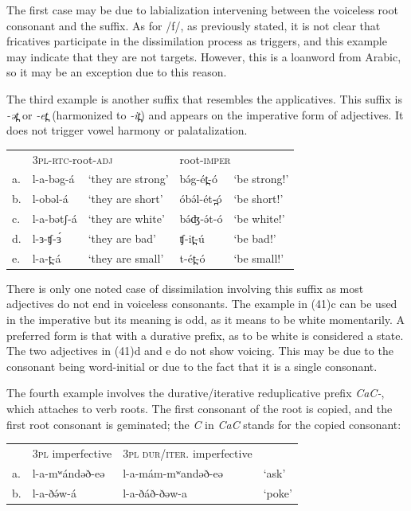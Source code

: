 The first case may be due to labialization intervening between the voiceless root consonant and the suffix. As for /f/, as previously stated, it is not clear that fricatives participate in the dissimilation process as triggers, and this example may indicate that they are not targets. However, this is a loanword from Arabic, so it may be an exception due to this reason. 

The third example is another suffix that resembles the applicatives. This suffix is \textit{-ət̪} or \textit{-et̪} (harmonized to \textit{-it̪}) and appears on the imperative form of adjectives. It does not trigger vowel harmony or palatalization. 

\ea
\begin{tabular}[t]{lllll}
&	\multicolumn{2}{l}{3\textsc{pl}-\textsc{rtc}-root-\textsc{adj}}	&	\multicolumn{2}{l}{root-\textsc{imper}}\\
a.&	l-a-bəg-á	& `they are strong' &	bə́g-ét̪-ó	&	‘be strong!’\\
b.&	l-obəl-á	& `they are short' &	óbə́l-ét-̪ó	&	‘be short!’\\
c.& l-a-bətʃ-á	& `they are white' &	bə́ʤ-ə́t-ó	&	‘be white!’   \\
d.& l-ɜ-ʧ-ɜ́	& `they are bad'	&	ʧ-it̪-ú		&	‘be bad!’\\
e.& l-a-t̪-á	& `they are small'	&	t-ét̪-ó		&	‘be small!’\\
\end{tabular}
\z

There is only one noted case of dissimilation involving this suffix as most adjectives do not end in voiceless consonants. The example in (41)c can be used in the imperative but its meaning is odd, as it means to be white momentarily. A preferred form is that with a durative prefix, as to be white is considered a state. The two adjectives in (41)d and e do not show voicing. This may be due to the consonant being word-initial or due to the fact that it is a single consonant. 

The fourth example involves the durative/iterative reduplicative prefix \textit{CaC-}, which attaches to verb roots. The first consonant of the root is copied, and the first root consonant is geminated; the \textit{C} in \textit{CaC} stands for the copied consonant:

\ea
\begin{tabular}[t]{llll}
&	 	3\textsc{pl} imperfective		&	3\textsc{pl} \textsc{dur}/\textsc{iter}. imperfective\\
	a.&		l-a-mʷándəð-eə 	&	l-a-mám-mʷandəð-eə	&	‘ask’\\
	b.&		l-a-ðə́w-á		&	l-a-ðáð-ðəw-a		&	‘poke’\\
\end{tabular}
\z

